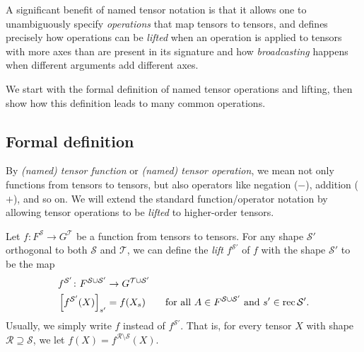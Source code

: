 A significant benefit of named tensor notation is that it allows one to unambiguously specify \emph{operations} that map tensors to tensors, and defines precisely how operations can be \emph{lifted} when an 
operation is applied to tensors with more axes than are present in its signature and how \emph{broadcasting} happens when different arguments add different axes.

We start with the formal definition of named tensor operations and lifting, then show how this definition leads to many common operations.

\subsection{Formal definition}

By \emph{(named) tensor function} or \emph{(named) tensor operation}, we mean not only functions from tensors to tensors, but also operators like negation ($-$), addition ($+$), and so on. We will extend the standard function/operator notation by allowing tensor operations to be \emph{lifted} to higher-order tensors.

\begin{definition} \label{def:lifting}
Let $f \colon F^{\mathcal{S}} \rightarrow G^{\mathcal{T}}$ be a function from tensors to tensors. For any shape $\mathcal{S'}$ orthogonal to both $\mathcal{S}$ and $\mathcal{T}$, we can define the \emph{lift} $f^{\mathcal{S'}}$ of $f$ with the shape $\mathcal{S'}$ to be the map
\begin{align*}
f^{\mathcal{S'}} \colon F^{\mathcal{S} \cup \mathcal{S'}} &\rightarrow G^{\mathcal{T} \cup \mathcal{S'}} \\
\left[f^{\mathcal{S'}}(X)\right]_{s'} &= f(X_s) \qquad \text{for all $A \in F^{\mathcal{S}\cup\mathcal{S'}}$ and  $s' \in \operatorname{rec}\mathcal{S'}$.}
\end{align*}
Usually, we simply write $f$ instead of $f^{\mathcal{S'}}$. That is, for every tensor $X$ with shape  $\mathcal{R} \supseteq \mathcal{S}$, we let $f(X) = f^{\mathcal{R} \setminus \mathcal{S}}(X)$.
\end{definition}

